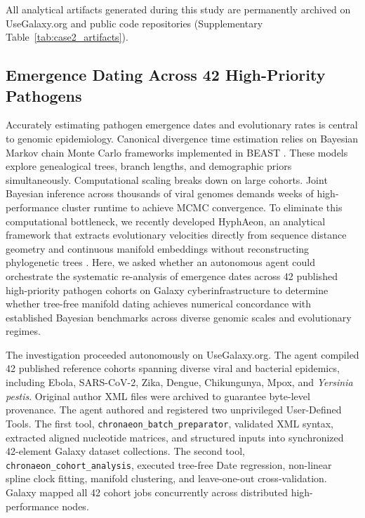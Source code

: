 \documentclass[11pt,letterpaper]{article}
\begin{document}
All analytical artifacts generated during this study are permanently archived on UseGalaxy.org and public code repositories (Supplementary Table~\ref{tab:case2_artifacts}).

\subsection{Emergence Dating Across 42 High-Priority Pathogens}

Accurately estimating pathogen emergence dates and evolutionary rates is central to genomic epidemiology. Canonical divergence time estimation relies on Bayesian Markov chain Monte Carlo frameworks implemented in BEAST \cite{suchard2018}. These models explore genealogical trees, branch lengths, and demographic priors simultaneously. Computational scaling breaks down on large cohorts. Joint Bayesian inference across thousands of viral genomes demands weeks of high-performance cluster runtime to achieve MCMC convergence. To eliminate this computational bottleneck, we recently developed HyphAeon, an analytical framework that extracts evolutionary velocities directly from sequence distance geometry and continuous manifold embeddings without reconstructing phylogenetic trees \cite{pond2026hyphaeon}. Here, we asked whether an autonomous agent could orchestrate the systematic re-analysis of emergence dates across 42 published high-priority pathogen cohorts on Galaxy cyberinfrastructure to determine whether tree-free manifold dating achieves numerical concordance with established Bayesian benchmarks across diverse genomic scales and evolutionary regimes.

The investigation proceeded autonomously on UseGalaxy.org. The agent compiled 42 published reference cohorts spanning diverse viral and bacterial epidemics, including Ebola, SARS-CoV-2, Zika, Dengue, Chikungunya, Mpox, and \textit{Yersinia pestis}. Original author XML files were archived to guarantee byte-level provenance. The agent authored and registered two unprivileged User-Defined Tools. The first tool, \texttt{chronaeon\_batch\_preparator}, validated XML syntax, extracted aligned nucleotide matrices, and structured inputs into synchronized 42-element Galaxy dataset collections. The second tool, \texttt{chronaeon\_cohort\_analysis}, executed tree-free Date regression, non-linear spline clock fitting, manifold clustering, and leave-one-out cross-validation. Galaxy mapped all 42 cohort jobs concurrently across distributed high-performance nodes.
\end{document}
